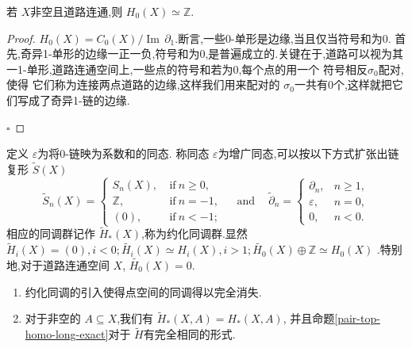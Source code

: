 \documentclass[../../几何与拓扑.tex]{subfiles}
\begin{document}
\begin{proposition}
    若 \(  X  \)非空且道路连通,则 \(  H_0\left( X \right)\simeq \mathbb{Z}    \).  
\end{proposition}
\begin{proof}
    \(  H_0\left( X \right)= C_0\left( X \right) / \operatorname{Im}\, \partial _{1}    \).断言,一些0-单形是边缘,当且仅当符号和为0.  首先,奇异1-单形的边缘一正一负,符号和为0,是普遍成立的.关键在于,道路可以视为其一1-单形,道路连通空间上,一些点的符号和若为0,每个点的用一个 符号相反\(   \sigma _0   \)配对,使得 它们称为连接两点道路的边缘,这样我们用来配对的 \(   \sigma _0   \)一共有0个,这样就把它们写成了奇异1-链的边缘. 

    \hfill $\square$
\end{proof}
\begin{example}
    定义 \(   \varepsilon   \)为将0-链映为系数和的同态. 称同态 \(  \varepsilon   \)为增广同态,可以按以下方式扩张出链复形 \(  \tilde{S}\left( X \right)    \)           \[
         \tilde{S}_n(X)=\left\{\begin{array}{ll}S_n(X),&\mathrm{~if~}n\geq0,\\\mathbb{Z},&\mathrm{~if~}n=-1,\\(0),&\mathrm{~if~}n<-1;\end{array}\right.\quad\mathrm{~and~}\quad\tilde{\partial}_n=\left\{\begin{array}{ll}\partial_n,&n\geq1,\\\varepsilon,&n=0,\\0,&n<0.\end{array}\right.
     \]相应的同调群记作 \(  \tilde{H}_{*}\left( X \right)   \),称为约化同调群.显然 \(  \tilde{H}_{i}\left( X \right)= \left( 0 \right),i<0;\tilde{H_{i}}\left( X \right)\simeq H_{i}\left( X \right), i>1; \tilde{H_0}\left( X \right) \oplus \mathbb{Z} \simeq H_0\left( X \right)        \)  .特别地,对于道路连通空间 \(  X  \), \(  \tilde{H_0}\left( X \right)= 0   \).  
 \end{example}
 
 \begin{remark}
     \begin{enumerate}
         \item 约化同调的引入使得点空间的同调得以完全消失.
         \item 对于非空的 \(  A\subseteq X  \),我们有 \(   \tilde{H}_{*}\left( X,A \right)= H_{*}\left( X,A \right)   \),   并且命题\ref{pair-top-homo-long-exact}对于 \(  \tilde{H}  \)有完全相同的形式. 
     \end{enumerate}
     
 \end{remark}
 
\end{document}
